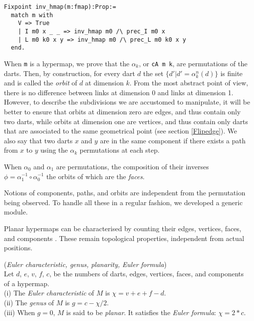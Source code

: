\documentclass{llncs}
\begin{document}
\begin{verbatim}
Fixpoint inv_hmap(m:fmap):Prop:=
  match m with
    V => True
    | I m0 x _ _ => inv_hmap m0 /\ prec_I m0 x
    | L m0 k0 x y => inv_hmap m0 /\ prec_L m0 k0 x y
  end.
\end{verbatim}

When {\tt m} is a hypermap, we prove that the \(\alpha_k\), or {\tt cA m k}, are permutations of the darts. Then, by construction, for every dart \(d\) the set \(\{d' | d' = \alpha^n_k(d)\}\) is finite and is called the {\em orbit} of \(d\)
at dimension \(k\). From the most abstract point of view, there is no difference between links at dimension 0 and links at dimension 1. However, to describe the subdivisions we are accustomed to manipulate, it will be better to ensure that orbits at dimension zero are edges, and thus contain only
two darts, while orbits at dimension one are vertices, and thus contain
only darts that are associated to the same geometrical point (see section \ref{Flipedge}).  We also
say that two darts \(x\) and \(y\) are in the same component if there
exists a path from \(x\) to \(y\) using the \(\alpha_k\) permutations at
each step.

When \(\alpha_0\) and \(\alpha_1\) are permutations, the composition of
their inverses \(\phi = \alpha_1^{-1} \circ \alpha_0^{-1}\) the orbits of
which are the {\em faces}.

Notions of components, paths, and orbits are independent from the
permutation being observed.  To handle all these in a regular fashion,
we developed a generic module.

Planar hypermaps can be characterised by counting their edges,
vertices, faces, and components \cite{duf08a}.  These remain topological
properties, independent from actual positions.

\begin{definition}({\em Euler characteristic, genus, planarity, Euler formula})\\
Let \(d\), \(e\), \(v\), \(f\), \(c\), be the numbers of darts, edges, vertices, faces, and components of a hypermap.\\
(i) The {\em Euler characteristic} of $M$ is $\chi= v + e + f - d$.\\
(ii) The {\em genus} of $M$ is $g = c -\chi / 2$.\\
(iii) When $g=0$, $M$ is said to be {\em planar}. 
It satisfies the {\em Euler formula}: $\chi = 2 * c$.
\end{definition}
\end{document}
